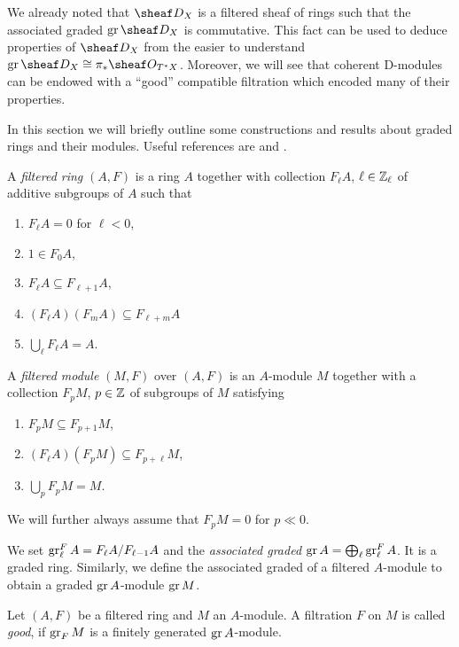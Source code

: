 \documentclass[number-in-sections,a4paper]{notes}
\begin{document}
We already noted that $\sD_X$ is a filtered sheaf of rings such that the associated graded $\gr \sD_X$ is commutative.
This fact can be used to deduce properties of $\sD_X$ from the easier to understand $\gr \sD_X \cong \pi_*\sO_{T^*X}$.
Moreover, we will see that coherent D-modules can be endowed with a \enquote{good} compatible filtration which encoded many of their properties.

In this section we will briefly outline some constructions and results about graded rings and their modules.
Useful references are \cite[Appendix~D]{HottaTakeuchiTanisaki:2008:DModulesPerverseSheavesRepresentationTheory} and \cite{Bjoerk:1979:RingsOfDifferentialOperators}.

\begin{Definition}\label{def:filtered-module}
    A \emph{filtered ring} $(A,F)$ is a ring $A$ together with collection $F_\ell A$, $\ell \in {\mathbb{Z}}_\ell$ of additive subgroups of $A$ such that
    \begin{enumerate}
        \item $F_\ell A = 0$ for $\ell < 0$,
        \item $1 \in F_0A$,
        \item $F_\ell A \subseteq F_{\ell+1}A$,
        \item $(F_\ell A)(F_mA) \subseteq F_{\ell+m}A$
        \item $\bigcup_\ell F_\ell A = A$.
    \end{enumerate}
    A \emph{filtered module} $(M,F)$ over $(A,F)$ is an $A$-module $M$ together with a collection $F_p M$, $p \in {\mathbb{Z}}$ of subgroups of $M$ satisfying
    \begin{enumerate}
        \item $F_p M \subseteq F_{p+1}M$,
        \item $(F_\ell A)(F_pM) \subseteq F_{p+\ell}M$,
        \item $\bigcup_p F_p M = M$.
    \end{enumerate}
    We will further always assume that $F_p M = 0$ for $p \ll 0$.
\end{Definition}
We set $\operatorname{gr}^F_\ell A = F_\ell A/F_{\ell-1}A$ and the \emph{associated graded} $\operatorname{gr} A = \bigoplus_\ell \operatorname{gr}_\ell^F A$.
It is a graded ring.
Similarly, we define the associated graded of a filtered $A$-module to obtain a graded $\operatorname{gr} A$-module $\operatorname{gr} M$.

\begin{Definition}
    Let $(A,F)$ be a filtered ring and $M$ an $A$-module.
    A filtration $F$ on $M$ is called \emph{good}, if $\operatorname{gr}_F M$ is a finitely generated $\operatorname{gr} A$-module.
\end{Definition}
\end{document}
